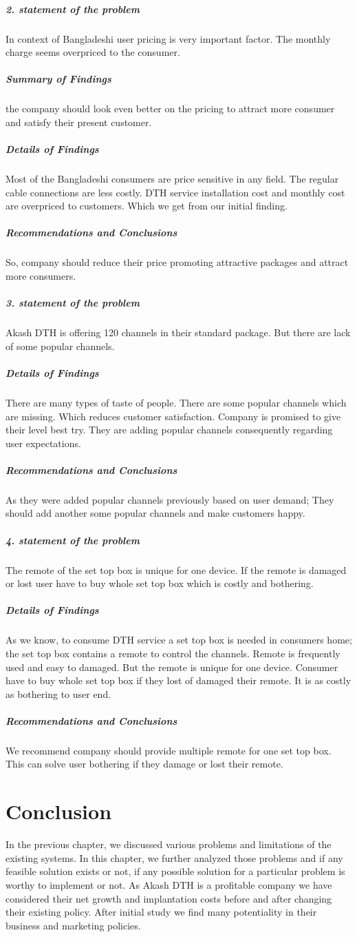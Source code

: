 \begin{spacing}{1.0}
\subparagraph{2. statement of the problem}
In context of Bangladeshi user pricing is very important factor. The monthly charge seems overpriced to the consumer.
\subparagraph{Summary of Findings}
the company should look even better on the pricing to attract more consumer and satisfy their present customer.
\subparagraph{Details of Findings}
Most of the Bangladeshi consumers are price sensitive in any field. The regular cable connections are less costly. DTH service installation cost and monthly cost are overpriced to customers. Which we get from our initial finding.
\subparagraph{Recommendations and Conclusions}
So, company should reduce their price promoting attractive packages and attract more consumers.

\subparagraph{3. statement of the problem}
Akash DTH is offering 120 channels in their standard package. But there are lack of some popular channels.
\subparagraph{Details of Findings}
There are many types of taste of people. There are some popular channels which are missing. Which reduces customer satisfaction. Company is promised to give their level best try. They are adding popular channels consequently regarding user expectations.
\subparagraph{Recommendations and Conclusions}
As they were added popular channels previously based on user demand; They should add another some popular channels and make customers happy.

\subparagraph{4. statement of the problem}
The remote of the set top box is unique for one device. If the remote is damaged or lost user have to buy whole set top box which is costly and bothering.
\subparagraph{Details of Findings}
As we know, to consume DTH service a set top box is needed in consumers home; the set top box contains a remote to control the channels. Remote is frequently used and easy to damaged. But the remote is unique for one device. Consumer have to buy whole set top box if they lost of damaged their remote. It is as costly as bothering to user end.
\subparagraph{Recommendations and Conclusions}
We recommend company should provide multiple remote for one set top box. This can solve user bothering if they damage or lost their remote.

\section{Conclusion}
In the previous chapter, we discussed various problems and limitations of the existing systems. In this chapter, we further analyzed those problems and if any feasible solution exists or not, if any possible solution for a particular problem is worthy to implement or not. As Akash DTH is a profitable company we have considered their net growth and implantation costs before and after changing their existing policy. After initial study we find many potentiality in their business and marketing policies.     
\end{spacing}